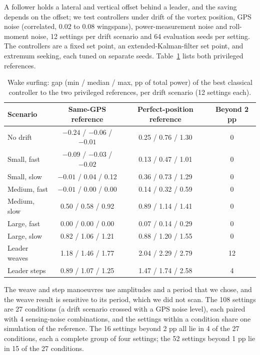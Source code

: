 \documentclass[11pt]{article}
\begin{document}
A follower holds a lateral and vertical offset behind a leader, and the saving depends on the offset; we test controllers under drift of the vortex position, GPS noise (correlated, 0.02 to 0.08 wingspans), power-measurement noise and roll-moment noise, 12 settings per drift scenario and 64 evaluation seeds per setting.
The controllers are a fixed set point, an extended-Kalman-filter set point, and extremum seeking, each tuned on separate seeds.
Table~\ref{tab:wake} lists both privileged references.

\begin{table}[h]
\centering
\small
\caption{Wake surfing: gap (min / median / max, pp of total power) of the best classical controller to the two privileged references, per drift scenario (12 settings each).}
\label{tab:wake}
\begin{tabular}{@{}lccc@{}}
\toprule
Scenario & Same-GPS reference & Perfect-position reference & Beyond 2 pp \\
\midrule
No drift & $-0.24$ / $-0.06$ / $-0.01$ & 0.25 / 0.76 / 1.30 & 0 \\
Small, fast & $-0.09$ / $-0.03$ / $-0.02$ & 0.13 / 0.47 / 1.01 & 0 \\
Small, slow & $-0.01$ / 0.04 / 0.12 & 0.36 / 0.73 / 1.29 & 0 \\
Medium, fast & $-0.01$ / 0.00 / 0.00 & 0.14 / 0.32 / 0.59 & 0 \\
Medium, slow & 0.50 / 0.58 / 0.92 & 0.89 / 1.14 / 1.41 & 0 \\
Large, fast & 0.00 / 0.00 / 0.00 & 0.07 / 0.14 / 0.29 & 0 \\
Large, slow & 0.82 / 1.06 / 1.21 & 0.88 / 1.20 / 1.55 & 0 \\
Leader weaves & 1.18 / 1.46 / 1.77 & 2.04 / 2.29 / 2.79 & 12 \\
Leader steps & 0.89 / 1.07 / 1.25 & 1.47 / 1.74 / 2.58 & 4 \\
\bottomrule
\end{tabular}
\end{table}

The weave and step manoeuvres use amplitudes and a period that we chose, and the weave result is sensitive to its period, which we did not scan.
The 108 settings are 27 conditions (a drift scenario crossed with a GPS noise level), each paired with 4 sensing-noise combinations, and the settings within a condition share one simulation of the reference.
The 16 settings beyond 2 pp all lie in 4 of the 27 conditions, each a complete group of four settings; the 52 settings beyond 1 pp lie in 15 of the 27 conditions.
\end{document}
